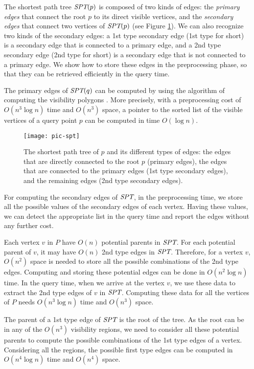 \documentclass[5p]{elsarticle}
\def\SPT{\mbox{\it{SPT}}}
\def\P{\mbox{${P}$}}
\begin{document}
The shortest path tree $\SPT(p)$ is composed of two
kinds of edges: the {\em primary edges} that connect the root $p$ to its direct visible
vertices, and the {\em secondary edges} that connect two vertices of $\SPT(p)$
(see Figure \ref{fig:pspt}).
We can also recognize two kinds of the secondary edges: a 1st type secondary edge 
(1st type for short) is a secondary edge that is connected to a primary edge, 
and a 2nd type secondary edge (2nd type for short) is a secondary edge that is not connected 
to a primary edge. We show how to store these edges in the preprocessing phase, so that
they can be retrieved efficiently in the query time.

The primary edges of $\SPT(q)$ can be computed 
by using the algorithm of computing the visibility polygons \cite{bose}. 
More precisely, with a preprocessing cost of $O(n^3 \log n)$ time and $O(n^3)$ space, 
a pointer to the sorted list of the visible vertices of a query point $p$ can be 
computed in time $O(\log n)$.


\begin{figure}[h]
  \centering
  \texttt{[image: pic-spt]}   \caption{The shortest path tree of $p$ and its different types of edges:
	the edges that are directly connected to the root $p$ (primary edges),  
	the edges that are connected to the primary edges (1st type secondary edges), 
	and the remaining edges (2nd type secondary edges).}
  \label{fig:pspt}
\end{figure}



For computing the secondary edges of $\SPT$,
in the preprocessing time,
we store all the possible values of the secondary edges of each vertex. 
Having these values, we can detect the appropriate list in the query time
and report the edges without any further cost.

Each vertex $v$ in $\P$ have $O(n)$ potential parents in $\SPT$. For each potential parent
of $v$, it may have $O(n)$ 2nd type edges in $\SPT$. Therefore, for a vertex $v$, 
$O(n^2)$ space is needed to store all the possible combinations of the 2nd type edges. 
Computing and storing these potential edges can be done in $O(n^2 \log n)$ time. 
In the query time, when we arrive at the vertex $v$, we use these 
data to extract the 2nd type edges of $v$ in $\SPT$. Computing these data for all the 
vertices of $\P$ needs $O(n^3 \log n)$ time and $O(n^3)$ space.

The parent of a 1st type edge of $\SPT$ is the root of 
the tree. As the root can be in any of the $O(n^3)$ visibility regions, 
we need to consider all these potential parents to compute
the possible combinations of the 1st type edges of a vertex.
Considering all the regions, the possible first type edges
can be computed in $O(n^4 \log n)$ time and $O(n^4)$ space. 
\end{document}
